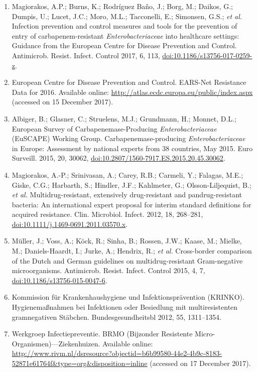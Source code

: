 \documentclass[
]{book}
\providecommand{\tightlist}{%
  \setlength{\itemsep}{0pt}\setlength{\parskip}{0pt}}
\begin{document}
\begin{enumerate}
\def\labelenumi{\arabic{enumi}.}
\tightlist
\item
  Magiorakos, A.P.; Burns, K.; Rodríguez Baño, J.; Borg, M.; Daikos, G.; Dumpis, U.; Lucet, J.C.; Moro, M.L.; Tacconelli, E.; Simonsen, G.S.; \emph{et al.} Infection prevention and control measures and tools for the prevention of entry of carbapenem-resistant \emph{Enterobacteriaceae} into healthcare settings: Guidance from the European Centre for Disease Prevention and Control. Antimicrob. Resist. Infect. Control 2017, 6, 113, \url{doi:10.1186/s13756-017-0259-z}.
\item
  European Centre for Disease Prevention and Control. EARS-Net Resistance Data for 2016. Available online: \url{http://atlas.ecdc.europa.eu/public/index.aspx} (accessed on 15 December 2017).
\item
  Albiger, B.; Glasner, C.; Struelens, M.J.; Grundmann, H.; Monnet, D.L.; European Survey of Carbapenemase-Producing \emph{Enterobacteriaceae} (EuSCAPE) Working Group. Carbapenemase-producing \emph{Enterobacteriaceae} in Europe: Assessment by national experts from 38 countries, May 2015. Euro Surveill. 2015, 20, 30062, \url{doi:10.2807/1560-7917.ES.2015.20.45.30062}.
\item
  Magiorakos, A.-P.; Srinivasan, A.; Carey, R.B.; Carmeli, Y.; Falagas, M.E.; Giske, C.G.; Harbarth, S.; Hindler, J.F.; Kahlmeter, G.; Olsson-Liljequist, B.; \emph{et al.} Multidrug-resistant, extensively drug-resistant and pandrug-resistant bacteria: An international expert proposal for interim standard definitions for acquired resistance. Clin. Microbiol. Infect. 2012, 18, 268--281, \url{doi:10.1111/j.1469-0691.2011.03570.x}.
\item
  Müller, J.; Voss, A.; Köck, R.; Sinha, B.; Rossen, J.W.; Kaase, M.; Mielke, M.; Daniels-Haardt, I.; Jurke, A.; Hendrix, R.; \emph{et al.} Cross-border comparison of the Dutch and German guidelines on multidrug-resistant Gram-negative microorganisms. Antimicrob. Resist. Infect. Control 2015, 4, 7, \url{doi:10.1186/s13756-015-0047-6}.
\item
  Kommission für Krankenhaushygiene und Infektionsprävention (KRINKO). Hygienemaßnahmen bei Infektionen oder Besiedlung mit multiresistenten gramnegativen Stäbchen. Bundesgesundheitsbl 2012, 55, 1311--1354.
\item
  Werkgroep Infectiepreventie. BRMO (Bijzonder Resistente Micro-Organismen)---Ziekenhuizen. Available online: \url{http://www.rivm.nl/dsresource?objectid=b6b99580-44e2-4b9c-8183-52871e61764f\&type=org\&disposition=inline} (accessed on 17 December 2017).

\end{enumerate}
\end{document}
